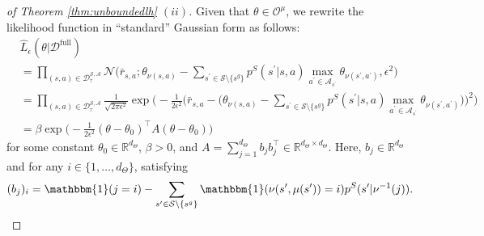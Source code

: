 \documentclass{amsart}
\begin{document}
\begin{proof}[of Theorem \ref{thm:unboundedlh} $(ii)$]
Given that $\theta \in \mathcal{O}^\mu$, we rewrite the likelihood function in ``standard'' Gaussian form as follows:
\begin{align*}
    &\hat{L}_\epsilon(\theta|\mathcal{D}^{\mathrm{full}}) \\
    &= \prod_{(s,a) \in \mathcal{D}_\tau^{\mathcal{S},\mathcal{A}}} \mathcal{N}\Bigg(\bar{r}_{s,a};\theta_{\nu(s,a)}  - \sum_{s^\prime \in \mathcal{S} \setminus \{s^g\}} p^S(s^\prime|s,a) \max_{a^\prime \in \mathcal{A}_{s^\prime}} \theta_{\nu(s^\prime, a^\prime)}, \epsilon^2\Bigg)\\
    &= \prod_{(s,a) \in \mathcal{D}_\tau^{\mathcal{S},\mathcal{A}}} \frac{1}{\sqrt{2\pi\epsilon^2}}\exp\Bigg(-\frac{1}{2\epsilon^2}\Bigg(\bar{r}_{s,a} - \Big(\theta_{\nu(s,a)} - \sum_{s^\prime \in \mathcal{S} \setminus \{s^g\}} p^S(s^\prime|s,a) \max_{a^\prime \in \mathcal{A}_{s^\prime}} \theta_{\nu(s^\prime, a^\prime)}\Big)\Bigg)^2\Bigg)\\
    &= \beta  \exp\Bigg(-\frac{1}{2\epsilon^2} (\theta-\theta_0)^\top A(\theta-\theta_0)\Bigg) 
\end{align*}
for some constant $\theta_0 \in \mathbb{R}^{d_\Theta}$, $\beta>0$, and $A=\sum_{j=1}^{d_\Theta} b_j b_j^\top \in \mathbb{R}^{d_\Theta \times d_\Theta}$. Here, $b_j \in \mathbb{R}^{d_\Theta}$ and for any $i \in \{1,\dots,d_\Theta\}$, satisfying
$$(b_j)_i = \mathbbm{1}(j=i) - \sum_{s^\prime \in \mathcal{S}\setminus \{s^g\}} \mathbbm{1} (\nu(s^\prime, \mu(s^\prime)) = i) p^S(s^\prime|\nu^{-1}(j)).$$


\end{proof}
\end{document}
